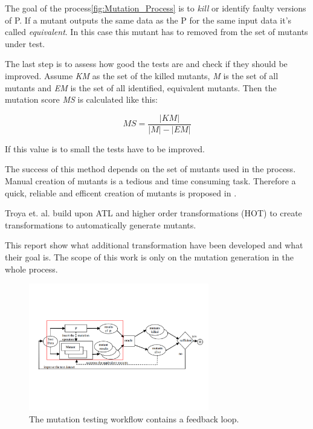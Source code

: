 \documentclass{llncs}
\begin{document}
The goal of the process\ref{fig:Mutation_Process} is to \textit{kill} or identify faulty versions of P. If a mutant outputs the same data as the P for the same input data it's called \textit{equivalent}. In this case this mutant has to removed from the set of mutants under test.

The last step is to assess how good the tests are and check if they should be improved. Assume \textit{KM} as the set of the killed mutants, \textit{M} is the set of all mutants and \textit{EM} is the set of all identified, equivalent mutants. Then the mutation score \textit{MS} is calculated like this:\cite{mutationssurvey:yue}

\begin{equation}
	MS = \frac{\left|KM\right|}{\left|M\right| - \left|EM\right|}
	\label{eq:ms}
\end{equation}

If this value is to small the tests have to be improved. 

The success of this method depends on the set of mutants used in the process. Manual creation of mutants is a tedious and time consuming task. Therefore a quick, reliable and efficent creation of mutants is proposed in \cite{troya:2015}.

Troya et. al. build upon ATL and higher order transformations (HOT) to create transformations to automatically generate mutants. 

This report show what additional transformation have been developed and what their goal is. The scope of this work is only on the mutation generation in the whole process.

\begin{figure}
	\centering
	\includegraphics[width=0.7\textwidth]{figures/Marked_Mutation_Process}
	\caption{The mutation testing workflow contains a feedback loop.\cite{MatMottu2006}}
	\label{fig:Marked_Mutation_Process}
\end{figure}
\end{document}
